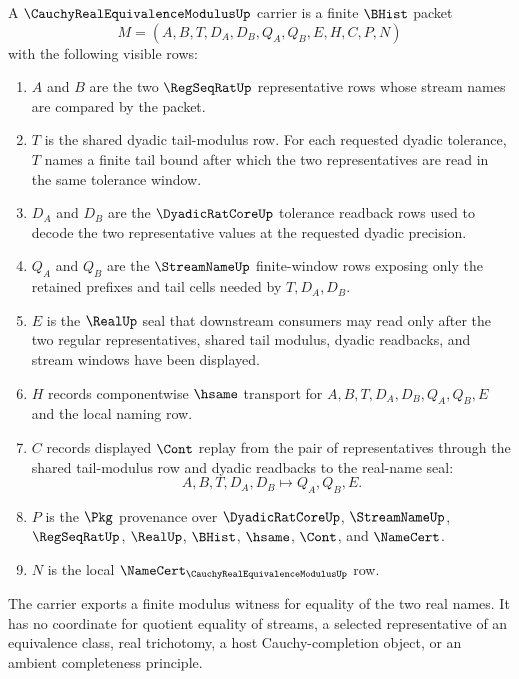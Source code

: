 \begin{definition}
\label{def:cauchy-real-equivalence-modulus-carrier}
A $\CauchyRealEquivalenceModulusUp$ carrier is a finite $\BHist$ packet
$$
M=(A,B,T,D_A,D_B,Q_A,Q_B,E,H,C,P,N)
$$
with the following visible rows:
\begin{enumerate}
\item $A$ and $B$ are the two $\RegSeqRatUp$ representative rows whose stream names are compared by the packet.
\item $T$ is the shared dyadic tail-modulus row. For each requested dyadic tolerance, $T$ names a finite tail bound after which the two representatives are read in the same tolerance window.
\item $D_A$ and $D_B$ are the $\DyadicRatCoreUp$ tolerance readback rows used to decode the two representative values at the requested dyadic precision.
\item $Q_A$ and $Q_B$ are the $\StreamNameUp$ finite-window rows exposing only the retained prefixes and tail cells needed by $T,D_A,D_B$.
\item $E$ is the $\RealUp$ seal that downstream consumers may read only after the two regular representatives, shared tail modulus, dyadic readbacks, and stream windows have been displayed.
\item $H$ records componentwise $\hsame$ transport for $A,B,T,D_A,D_B,Q_A,Q_B,E$ and the local naming row.
\item $C$ records displayed $\Cont$ replay from the pair of representatives through the shared tail-modulus row and dyadic readbacks to the real-name seal:
$$
A,B,T,D_A,D_B\longmapsto Q_A,Q_B,E .
$$
\item $P$ is the $\Pkg$ provenance over $\DyadicRatCoreUp$, $\StreamNameUp$, $\RegSeqRatUp$, $\RealUp$, $\BHist$, $\hsame$, $\Cont$, and $\NameCert$.
\item $N$ is the local $\NameCert_{\CauchyRealEquivalenceModulusUp}$ row.
\end{enumerate}
The carrier exports a finite modulus witness for equality of the two real names. It has no coordinate for quotient equality of streams, a selected representative of an equivalence class, real trichotomy, a host Cauchy-completion object, or an ambient completeness principle.
\end{definition}

